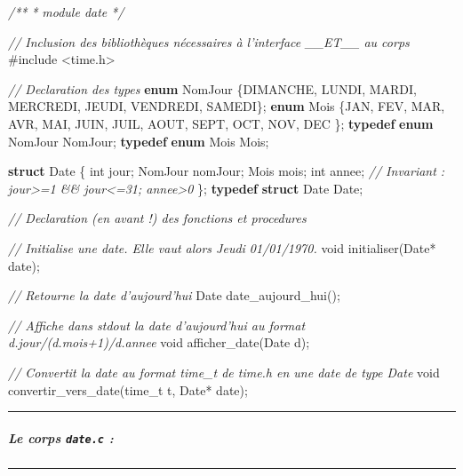 \documentclass[11pt]{article}
\newenvironment{Shaded}{}{}
\newcommand{\KeywordTok}[1]{\textcolor[rgb]{0.00,0.44,0.13}{\textbf{{#1}}}}
\newcommand{\DataTypeTok}[1]{\textcolor[rgb]{0.56,0.13,0.00}{{#1}}}
\newcommand{\CommentTok}[1]{\textcolor[rgb]{0.38,0.63,0.69}{\textit{{#1}}}}
\newcommand{\NormalTok}[1]{{#1}}
\newcommand{\ImportTok}[1]{{#1}}
\newcommand{\PreprocessorTok}[1]{\textcolor[rgb]{0.74,0.48,0.00}{{#1}}}
\begin{document}
\begin{Shaded}
\begin{Highlighting}[]
\CommentTok{/**}
\CommentTok{ *  module date}
\CommentTok{ */}

\CommentTok{// Inclusion des bibliothèques nécessaires à l'interface __ET__ au corps}
\PreprocessorTok{#include }\ImportTok{<time.h>}

\CommentTok{// Declaration des types }
\KeywordTok{enum}\NormalTok{ NomJour \{DIMANCHE, LUNDI, MARDI, MERCREDI, JEUDI, VENDREDI, SAMEDI\};}
\KeywordTok{enum}\NormalTok{ Mois \{JAN, FEV, MAR, AVR, MAI, JUIN, JUIL, AOUT, SEPT, OCT, NOV, DEC \};}
\KeywordTok{typedef} \KeywordTok{enum}\NormalTok{ NomJour NomJour;}
\KeywordTok{typedef} \KeywordTok{enum}\NormalTok{ Mois Mois;}

\KeywordTok{struct}\NormalTok{ Date \{}
    \DataTypeTok{int}\NormalTok{ jour;}
\NormalTok{    NomJour nomJour;}
\NormalTok{    Mois mois;}
    \DataTypeTok{int}\NormalTok{ annee;}
    \CommentTok{// Invariant : jour>=1 && jour<=31; annee>0}
\NormalTok{\};}
\KeywordTok{typedef} \KeywordTok{struct}\NormalTok{ Date Date;}


\CommentTok{// Declaration (en avant !) des fonctions et procedures}

\CommentTok{// Initialise une date. Elle vaut alors Jeudi 01/01/1970.}
\DataTypeTok{void}\NormalTok{ initialiser(Date* date);}

\CommentTok{// Retourne la date d'aujourd'hui}
\NormalTok{Date date_aujourd_hui();}

\CommentTok{// Affiche dans stdout la date d'aujourd'hui au format d.jour/(d.mois+1)/d.annee}
\DataTypeTok{void}\NormalTok{ afficher_date(Date d);}

\CommentTok{// Convertit la date au format time_t de time.h en une date de type Date}
\DataTypeTok{void}\NormalTok{ convertir_vers_date(time_t t, Date* date); }
\end{Highlighting}
\end{Shaded}

    \begin{center}\rule{0.5\linewidth}{\linethickness}\end{center}

\subparagraph{\texorpdfstring{Le corps \texttt{date.c}
:}{Le corps date.c :}}\label{le-corps-date.c}

\begin{center}\rule{0.5\linewidth}{\linethickness}\end{center}
\end{document}
